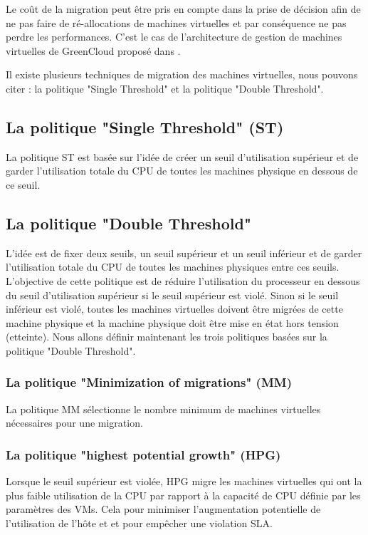 \begin{onehalfspace}
Le coût de la migration peut être pris en compte dans la prise de décision afin de ne pas faire de ré-allocations de machines virtuelles et par conséquence ne pas perdre les  performances. C'est le cas de l'architecture de gestion de machines virtuelles de  GreenCloud proposé dans \cite{ref32}.

Il existe plusieurs techniques de migration des machines virtuelles, nous pouvons citer : la politique "Single Threshold" et la politique "Double Threshold".

\subsection{La politique "Single Threshold" (ST)}

La politique ST est basée sur l'idée de créer un seuil d'utilisation supérieur et de garder l'utilisation totale du CPU de toutes les machines physique en dessous de ce seuil.

\subsection{La politique "Double Threshold"}

L'idée est de fixer deux seuils, un seuil supérieur et un seuil inférieur et de garder l'utilisation totale du CPU de toutes les machines physiques entre ces seuils. L'objective de cette politique est de  réduire l'utilisation du processeur en dessous du seuil d'utilisation supérieur si le seuil supérieur est violé. Sinon si le seuil inférieur est violé, toutes les machines virtuelles doivent être migrées de cette machine physique et la machine physique doit être mise en état hors tension (etteinte). Nous allons définir maintenant les trois politiques basées sur la politique "Double Threshold".  

\subsubsection{La politique "Minimization of migrations" (MM)}

La politique MM sélectionne le nombre minimum de machines virtuelles nécessaires pour une migration.

\subsubsection{La politique "highest potential growth" (HPG)}

Lorsque le seuil supérieur est violée, HPG migre les machines virtuelles qui ont la plus faible utilisation de la CPU par rapport à la capacité de CPU définie par les paramètres des VMs. Cela pour minimiser l'augmentation potentielle de l'utilisation de l'hôte et et pour empêcher une violation SLA.


\end{onehalfspace}
